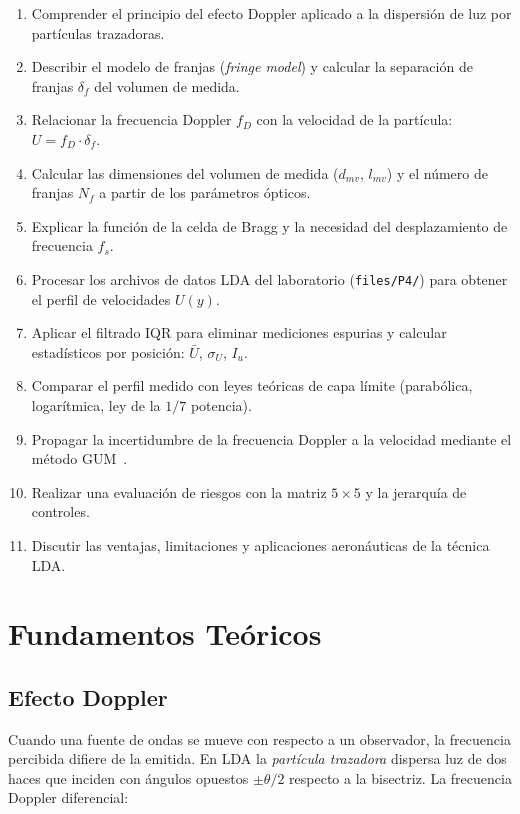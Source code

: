 \documentclass[12pt,a4paper]{article}
\begin{document}
\begin{enumerate}
	\item Comprender el principio del efecto Doppler aplicado a la dispersión
	      de luz por partículas trazadoras.
	\item Describir el modelo de franjas (\emph{fringe model}) y calcular la
	      separación de franjas $\delta_f$ del volumen de medida.
	\item Relacionar la frecuencia Doppler $f_D$ con la velocidad de la
	      partícula: $U = f_D \cdot \delta_f$.
	\item Calcular las dimensiones del volumen de medida ($d_{mv}$, $l_{mv}$)
	      y el número de franjas $N_f$ a partir de los parámetros ópticos.
	\item Explicar la función de la celda de Bragg y la necesidad del
	      desplazamiento de frecuencia $f_s$.
	\item Procesar los archivos de datos LDA del laboratorio
	      (\texttt{files/P4/}) para obtener el perfil de velocidades $U(y)$.
	\item Aplicar el filtrado IQR para eliminar mediciones espurias y
	      calcular estadísticos por posición: $\bar{U}$, $\sigma_U$,
	      $I_u$.
	\item Comparar el perfil medido con leyes teóricas de capa límite
	      (parabólica, logarítmica, ley de la $1/7$ potencia).
	\item Propagar la incertidumbre de la frecuencia Doppler a la velocidad
	      mediante el método GUM~\cite{gum2008}.
	\item Realizar una evaluación de riesgos con la matriz $5\times5$ y la
	      jerarquía de controles.
	\item Discutir las ventajas, limitaciones y aplicaciones aeronáuticas de
	      la técnica LDA.
\end{enumerate}

\section{Fundamentos Teóricos}
\label{sec:teoria}

\subsection{Efecto Doppler}
\label{subsec:doppler}

Cuando una fuente de ondas se mueve con respecto a un observador, la
frecuencia percibida difiere de la emitida.  En LDA la \emph{partícula
	trazadora} dispersa luz de dos haces que inciden con ángulos opuestos
$\pm\theta/2$ respecto a la bisectriz.  La frecuencia Doppler diferencial:
\end{document}
